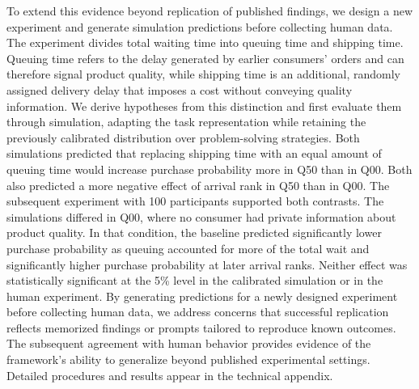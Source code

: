\documentclass[12pt,letterpaper]{article}
\begin{document}
To extend this evidence beyond replication of published findings, we design a new experiment and generate simulation predictions before collecting human data. The experiment divides total waiting time into queuing time and shipping time. Queuing time refers to the delay generated by earlier consumers’ orders and can therefore signal product quality, while shipping time is an additional, randomly assigned delivery delay that imposes a cost without conveying quality information. We derive hypotheses from this distinction and first evaluate them through simulation, adapting the task representation while retaining the previously calibrated distribution over problem-solving strategies. Both simulations predicted that replacing shipping time with an equal amount of queuing time would increase purchase probability more in Q50 than in Q00. Both also predicted a more negative effect of arrival rank in Q50 than in Q00. The subsequent experiment with 100 participants supported both contrasts. The simulations differed in Q00, where no consumer had private information about product quality. In that condition, the baseline predicted significantly lower purchase probability as queuing accounted for more of the total wait and significantly higher purchase probability at later arrival ranks. Neither effect was statistically significant at the 5\% level in the calibrated simulation or in the human experiment. By generating predictions for a newly designed experiment before collecting human data, we address concerns that successful replication reflects memorized findings or prompts tailored to reproduce known outcomes. The subsequent agreement with human behavior provides evidence of the framework’s ability to generalize beyond published experimental settings. Detailed procedures and results appear in the technical appendix.

\end{document}
